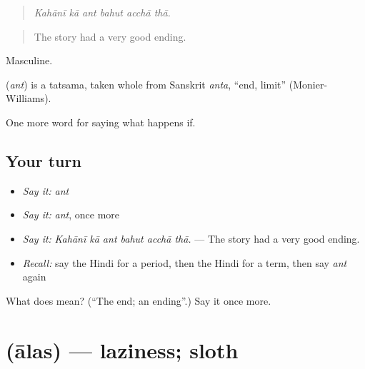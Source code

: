 \begin{quote}
     
\end{quote}

\begin{quote}
\emph{Kahānī kā ant bahut acchā thā.}
\end{quote}

\begin{quote}
The story had a very good ending.
\end{quote}

Masculine.

\begin{cousinweb}
\textbf{} (\emph{ant}) is a tatsama, taken whole from Sanskrit \emph{anta}, \textquotedblleft{}end, limit\textquotedblright{} (Monier-Williams).
\end{cousinweb}

\begin{grammarlens}[title={What you've built}]
One more word for saying what happens if.
\end{grammarlens}

\subsection*{Your turn}
\begin{itemize}
\raggedright
  \item \emph{Say it:} \emph{ant}
  \item \emph{Say it:} \emph{ant}, once more
  \item \emph{Say it:} \emph{Kahānī kā ant bahut acchā thā.} — The story had a very good ending.
  \item \emph{Recall:} say the Hindi for a period, then the Hindi for a term, then say \emph{ant} again
\end{itemize}

\begin{tcolorbox}[breakable,colback=teal!4,colframe=teal!35!black,title={Before you move on}]
What does  mean? (\textquotedblleft{}The end; an ending\textquotedblright{}.) Say it once more.
\end{tcolorbox}
\section[\texorpdfstring{\hi{आलस} (ālas)}{आलस (ālas)}]{ (ālas) — laziness; sloth}

\label{lesson:HI-C548-alas}



